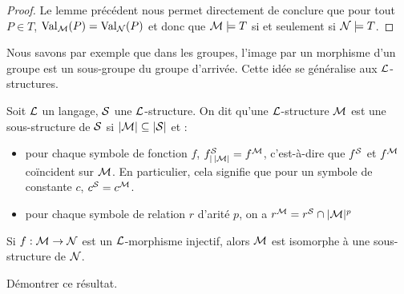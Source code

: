 \begin{proof}
    Le lemme précédent nous permet directement de conclure que pour tout $P\in T$, $\mathrm{Val}_{\mathcal M}(P) = \mathrm{Val}_{\mathcal N}(P)$ et donc que $\mathcal M\models T$ si et seulement si $\mathcal N\models T$.
\end{proof}

Nous savons par exemple que dans les groupes, l'image par un morphisme d'un groupe est un sous-groupe du groupe d'arrivée. Cette idée se généralise aux $\mathcal L$-structures.

\begin{defi}
    Soit $\mathcal L$ un langage, $\mathcal S$ une $\mathcal L$-structure. On dit qu'une $\mathcal L$-structure $\mathcal M$ est une sous-structure de $\mathcal S$ si $|\mathcal M|\subseteq |\mathcal S|$ et :
    \begin{itemize}[label=$\bullet$]
        \item pour chaque symbole de fonction $f$, $f^\mathcal S_{|\,|\mathcal M|}=f^\mathcal M$, c'est-à-dire que $f^\mathcal S$ et $f^\mathcal M$ coïncident sur $\mathcal M$. En particulier, cela signifie que pour un symbole de constante $c$, $c^\mathcal S = c^\mathcal M$.
        \item pour chaque symbole de relation $r$ d'arité $p$, on a $r^\mathcal M = r^\mathcal S\cap |\mathcal M|^p$
    \end{itemize}
\end{defi}

\begin{prop}
    Si $f : \mathcal M\to\mathcal N$ est un $\mathcal L$-morphisme injectif, alors $\mathcal M$ est isomorphe à une sous-structure de $\mathcal N$.
\end{prop}

\begin{exo}
    Démontrer ce résultat.
\end{exo}
